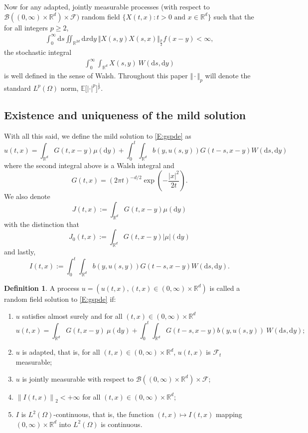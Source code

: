 \documentclass[a4paper,11pt]{article}
\numberwithin{equation}{section}
\theoremstyle{plain}
\theoremstyle{definition}
\newtheorem{definition}[theorem]{Definition}
\newcommand{\R}{\mathbb{R}}
\newcommand{\E}{\mathbb{E}}
\newcommand{\Norm}[1]{\left\|  #1   \right\|}
\newcommand{\ud}{\ensuremath{\mathrm{d}}}
\begin{document}
Now for any adapted, jointly measurable processes (with respect to $\mathcal B((0,\infty)\times \R^d)\times \mathcal F)$
random field $\{X(t,x): t>0 \text{ and } x \in \R^d\}$ such that the for all integers $p \ge 2$, 
\begin{align*}
	\int_0^\infty\ud s\iint_{\R^{2d}} \ud x \ud y \: \Vert X(s,y)X(s,x) \Vert_{\frac{p}{2}}f(x-y) < \infty,
\end{align*}
the stochastic integral 
\begin{align*}
	\int_0^\infty \int_{\R^d} X(s,y)\: W(\ud s, \ud y) 
\end{align*}
is well defined in the sense of Walsh. Throughout this paper $\Vert \cdot \Vert_p$ will denote the standard
$L^p(\Omega)$ norm, $\E\big[|\cdot|^p\big]^{\frac{1}{p}}$. 

\subsection{Existence and uniqueness of the mild solution}

With all this said, we define the mild solution to \eqref{E:gspde} as 
\begin{equation}
	u(t,x)=\int_{\R^d}G(t,x-y)\mu(\ud y) + \int_0^t\int_{\R^d}b(y,u(s,y))G(t-s,x-y)W(\ud s,\ud y) \label{E:gmsol}
\end{equation}
where the second integral above is a Walsh integral and 
\[
	 G(t,x) = (2 \pi t)^{-d/2}\exp\left( -\dfrac{|x|^2}{2t} \right).
\]
We also denote 
\[
	 J(t,x) := \int_{\R^d}G(t,x-y)\mu(\ud y) 
\]
with the distinction that 
\[
	J_0(t,x) := \int_{\R^d}G(t,x-y)|\mu|(\ud y) 
\]
and lastly,
\[
	 I(t,x):= \int_0^t\int_{\R^d}b(y,u(s,y))G(t-s,x-y)W(\ud s,\ud y). 
\]
\begin{definition}
	\label{D:Sol}
	A process $u=(u(t,x),(t,x)\in (0,\infty)\times \R^d)$ is called a random field solution to \eqref{E:gspde} if: 
	\begin{enumerate}
		\item $u$ satisfies almost surely and for all $(t,x) \in (0,\infty)\times \R^d$
			\[ 
				u(t,x) = \int_{\R^d}G(t,x-y)\:\mu( \ud y) +
				\int_0^t\int_{\R^d}G(t-s,x-y)b(y,u(s,y)) \:
				W(\ud s, \ud y);
			\]
		\item $u$ is adapted, that is, for all $(t,x) \in (0,\infty)\times \R^d$, $u(t,x)$ is $\mathcal F_t$ measurable; 
		\item $u$ is jointly measurable with respect to $\mathcal B((0,\infty)\times \R^d) \times \mathcal F$;
		\item $\Norm{I(t,x)}_2 < + \infty $ for all $(t,x) \in (0,\infty)\times \R^d$;
		\item $I$ is $L^2(\Omega)$-continuous, that is, the function $(t,x) \mapsto I(t,x)$ mapping $(0,\infty)\times \R^d$ into $L^2(\Omega)$ is continuous. 
	\end{enumerate}
\end{definition}
\end{document}
